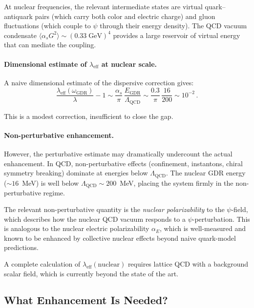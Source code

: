 \documentclass[aps,prd,twocolumn,superscriptaddress,nofootinbib]{revtex4-2}
\newcommand{\lam}{\lambda}
\newcommand{\wGDR}{\omega_{\mathrm{GDR}}}
\newcommand{\EGDR}{E_{\mathrm{GDR}}}
\begin{document}
At nuclear frequencies, the relevant intermediate states are
virtual quark--antiquark pairs (which carry both color and electric
charge) and gluon fluctuations (which couple to $\psi$ through
their energy density).  The QCD vacuum condensate
$\langle\alpha_s G^2\rangle \sim (0.33\;\mathrm{GeV})^4$ provides
a large reservoir of virtual energy that can mediate the coupling.

\paragraph{Dimensional estimate of $\lam_{\mathrm{eff}}$ at nuclear scale.}
A naive dimensional estimate of the dispersive correction gives:
\begin{equation}
\frac{\lam_{\mathrm{eff}}(\wGDR)}{\lam} - 1 \sim
\frac{\alpha_s}{\pi}\,\frac{\EGDR}{\Lambda_{\mathrm{QCD}}}
\sim \frac{0.3}{\pi}\,\frac{16}{200}
\sim 10^{-2}\,.
\end{equation}

This is a modest correction, insufficient to close the gap.

\paragraph{Non-perturbative enhancement.}
However, the perturbative estimate may dramatically undercount
the actual enhancement.  In QCD, non-perturbative effects
(confinement, instantons, chiral symmetry breaking) dominate at
energies below $\Lambda_{\mathrm{QCD}}$.  The nuclear GDR energy
($\sim\!16$~MeV) is well below $\Lambda_{\mathrm{QCD}} \sim
200$~MeV, placing the system firmly in the non-perturbative regime.

The relevant non-perturbative quantity is the \emph{nuclear
polarizability} to the $\psi$-field, which describes how the
nuclear QCD vacuum responds to a $\psi$-perturbation.  This is
analogous to the nuclear electric polarizability $\alpha_E$, which
is well-measured and known to be enhanced by collective nuclear
effects beyond naive quark-model predictions.

A complete calculation of $\lam_{\mathrm{eff}}(\mathrm{nuclear})$
requires lattice QCD with a background scalar field, which is
currently beyond the state of the art.

\subsection{What Enhancement Is Needed?}
\label{sec:needed}
\end{document}
